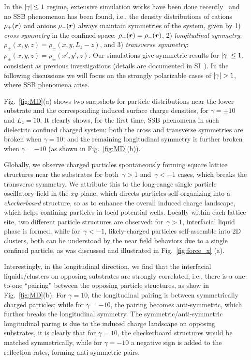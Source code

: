 In the $\lvert\gamma\rvert\leq 1$ regime, extensive simulation works have been done recently~\cite{liang2020harmonic,yuan2021particle} and no SSB phenomenon has been found, i.e., the density distributions of cations $\rho_{+}(\boldsymbol{r})$ and anions $\rho_{-}(\boldsymbol{r})$  always maintain symmetries of the system, given by 1) \emph{cross symmetry} in the confined space: $\rho_{+}(\boldsymbol{r})=\rho_{-}(\boldsymbol{r})$, 2) \emph{longitudinal symmetry}: $\rho_{\pm}(x,y,z)=\rho_{\pm}(x,y,L_z-z)$, and 3) \emph{transverse symmetry}: $\rho_{\pm}(x,y,z)=\rho_{\pm}(x',y',z)$. 
Our simulations give symmetric results for  $\lvert\gamma\rvert\leq 1$, consistent as previous investigations (details are documented in SI~\cite{SI}). 
In the following discussions we will focus on the strongly polarizable cases of $\lvert\gamma\rvert>1$, where SSB phenomena arise.

Fig.~\ref{fig:MD}(a) shows two snapshots for particle distributions near the lower substrate and the corresponding induced surface charge densities, for $\gamma=\pm10$ and $L_z=10$. It clearly shows, for the first time, SSB phenomena in such dielectric confined charged system: both the cross and transverse symmetries are broken when $\gamma=10$; and the remaining longitudinal symmetry is further broken when $\gamma=-10$ (as shown in Fig.~\ref{fig:MD}(b)).

Globally, we observe charged particles spontaneously forming square lattice structures near the substrates for both~$\gamma > 1$ and~$\gamma < -1$ cases, which breaks the transverse symmetry. 
We attribute this to the long-range single particle oscillatory field in the $xy$-plane, which directs particles self-organizing into a \emph{checkerboard} structure, so as to enhance the overall induced charge landscape, which helps confining particles in local potential wells.
Locally within each lattice site, two different particle structures are observed: for~$\gamma >1$, interfacial liquid phase is formed, while for~$\gamma < -1$, likely-charged particles self-assemble into 2D clusters, both can be understood by the near field behaviors due to a single confined particle, as was discussed and illustrated in Fig.~\ref{fig:force_x} (a).

Interestingly, in the longitudinal direction, we find that the interfacial liquids/clusters on opposing substrates are strongly correlated, i.e., there is a one-to-one “pairing” between the opposing particle structures, as show in Fig.~\ref{fig:MD}(b).
For $\gamma=10$, the longitudinal pairing is between symmetrically charged particles; while for $\gamma=-10$, the pairing becomes anti-symmetric, which further breaks the longitudinal symmetry. The symmetric/anti-symmetric longitudinal paring is due to the induced charge landscape on opposing substrates, it is clearly that for $\gamma=10$, the checkerboard structures would be matched symmetrically, while for $\gamma=-10$ a negative sign is added to the reflection rates, forming anti-symmetric pairs.


